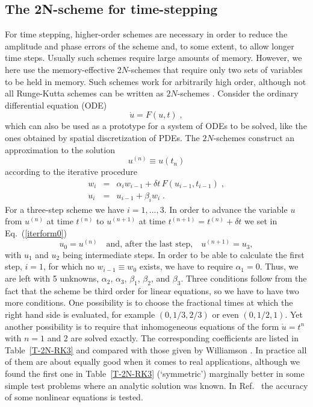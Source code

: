 \documentclass[\mydriver,12pt,twoside,notitlepage,a4paper]{article}
\newcommand{\Eq}[1]{Eq.~(\ref{#1})}
\begin{document}
\subsection{The 2N-scheme for time-stepping}
\label{S-2N-scheme}

For time stepping, higher-order schemes are necessary in order to reduce
the amplitude and phase errors of the scheme and, to some extent, to allow
longer time steps.
Usually such schemes require large amounts of memory.
However, we here use the memory-effective $2N$-schemes that require only
two sets of variables to be held in memory.
Such schemes work for
arbitrarily high order, although not all Runge-Kutta schemes can be
written as $2N$-schemes \cite{2Nstorage,SH88}.
Consider the ordinary differential equation (ODE)
\begin{equation}
  \dot{u} = F(u,t) \; ,
\end{equation}
which can also be used as a prototype for a system of ODEs to be solved,
like the ones obtained by spatial discretization of PDEs.
The $2N$-schemes construct an approximation to the solution
\begin{equation}
  u^{(n)} \equiv u(t_n)
\end{equation}
according to the iterative procedure
\begin{eqnarray}
  w_i &=& \alpha_i w_{i-1}+\delta t\,F(u_{i-1},t_{i-1}) \;, \\
  u_i &=& u_{i-1}+\beta_i w_i \;.
\label{iterform0}
\end{eqnarray}
For a three-step scheme we have $i=1,...,3$.
In order to advance the variable $u$ from $u^{(n)}$ at time $t^{(n)}$
to $u^{(n+1)}$ at time $t^{(n+1)}=t^{(n)}+\delta t$ we set in \Eq{iterform0}
\begin{equation}
  u_0=u^{(n)}
  \quad\mbox{and, after the last step,}\quad
  u^{(n+1)}=u_3,
\end{equation}
with $u_1$ and $u_2$ being intermediate steps. In order to be able to
calculate the first step, $i=1$, for which no $w_{i-1}\equiv w_0$ exists,
we have to require $\alpha_1=0$. Thus, we are left with 5 unknowns,
$\alpha_2$, $\alpha_3$, $\beta_1$, $\beta_2$, and $\beta_3$. Three
conditions follow from the fact that the scheme be third order
for linear equations, so we
have to have two more conditions. One possibility is to choose the
fractional times at which the right hand side is evaluated, for
example $(0,1/3,2/3)$ or even $(0,1/2,1)$.
Yet another possibility is to require that
inhomogeneous equations of the form $\dot{u}=t^n$ with $n=1$ and 2 are
solved exactly.
The corresponding coefficients are listed in Table~\ref{T-2N-RK3} and compared
with those given by Williamson \cite{2Nstorage}. In practice all of them
are about equally good when it comes to real applications, although
we found the first one in Table~\ref{T-2N-RK3} (`symmetric') marginally better in some
simple test problems where an analytic solution was known.
In Ref.~\cite{Ref-1} the accuracy of some nonlinear equations is tested.
\end{document}
